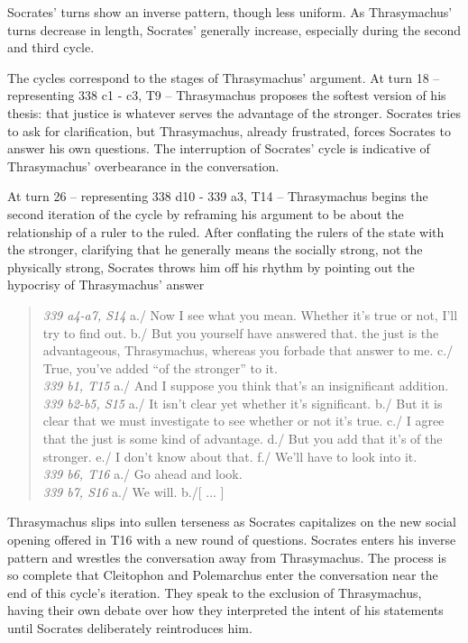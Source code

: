 \documentclass[noraggedright]{turabian-researchpaper}
\begin{document}
Socrates' turns show an inverse pattern, though less uniform. As Thrasymachus' turns decrease in length, Socrates' generally increase, especially during the second and third cycle.

The cycles correspond to the stages of Thrasymachus' argument. At turn 18 – representing 338 c1 - c3, T9 – Thrasymachus proposes the softest version of his thesis: that justice is whatever serves the advantage of the stronger. Socrates tries to ask for clarification, but Thrasymachus, already frustrated, forces Socrates to answer his own questions. The interruption of Socrates' cycle is indicative of Thrasymachus' overbearance in the conversation.

At turn 26 – representing 338 d10 - 339 a3, T14 – Thrasymachus begins the second iteration of the cycle by reframing his argument to be about the relationship of a ruler to the ruled. After conflating the rulers of the state with the stronger, clarifying that he generally means the socially strong, not the physically strong, Socrates throws him off his rhythm by pointing out the hypocrisy of Thrasymachus' answer

\begin{quote}
\emph{339 a4-a7, S14} a./ Now I see what you mean. Whether it's true or not, I'll try to find out. b./ But you yourself have answered that. the just is the advantageous, Thrasymachus, whereas you forbade that answer to me. c./ True, you've added ``of the stronger'' to it.\\
\emph{339 b1, T15} a./ And I suppose you think that's an insignificant addition.\\
\emph{339 b2-b5, S15} a./ It isn't clear yet whether it's significant. b./ But it is clear that we must investigate to see whether or not it's true. c./ I agree that the just is some kind of advantage. d./ But you add that it's of the stronger. e./ I don't know about that. f./ We'll have to look into it.\\
\emph{339 b6, T16} a./ Go ahead and look.\\
\emph{339 b7, S16} a./ We will. b./[ ... ]
\end{quote}

Thrasymachus slips into sullen terseness as Socrates capitalizes on the new social opening offered in T16 with a new round of questions. Socrates enters his inverse pattern and wrestles the conversation away from Thrasymachus. The process is so complete that Cleitophon and Polemarchus enter the conversation near the end of this cycle's iteration. They speak to the exclusion of Thrasymachus, having their own debate over how they interpreted the intent of his statements until Socrates deliberately reintroduces him.
\end{document}

